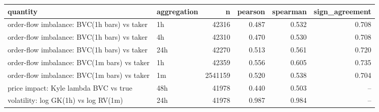 \begin{tabular}{llrrrr}
\toprule
quantity & aggregation & n & pearson & spearman & sign_agreement \\
\midrule
order-flow imbalance: BVC(1h bars) vs taker & 1h & 42316 & 0.487 & 0.532 & 0.708 \\
order-flow imbalance: BVC(1h bars) vs taker & 4h & 42310 & 0.470 & 0.530 & 0.708 \\
order-flow imbalance: BVC(1h bars) vs taker & 24h & 42270 & 0.513 & 0.561 & 0.720 \\
order-flow imbalance: BVC(1m bars) vs taker & 1h & 42359 & 0.556 & 0.605 & 0.735 \\
order-flow imbalance: BVC(1m bars) vs taker & 1m & 2541159 & 0.520 & 0.538 & 0.704 \\
price impact: Kyle lambda BVC vs true & 48h & 41978 & 0.440 & 0.503 & -- \\
volatility: log GK(1h) vs log RV(1m) & 24h & 41978 & 0.987 & 0.984 & -- \\
\bottomrule
\end{tabular}
